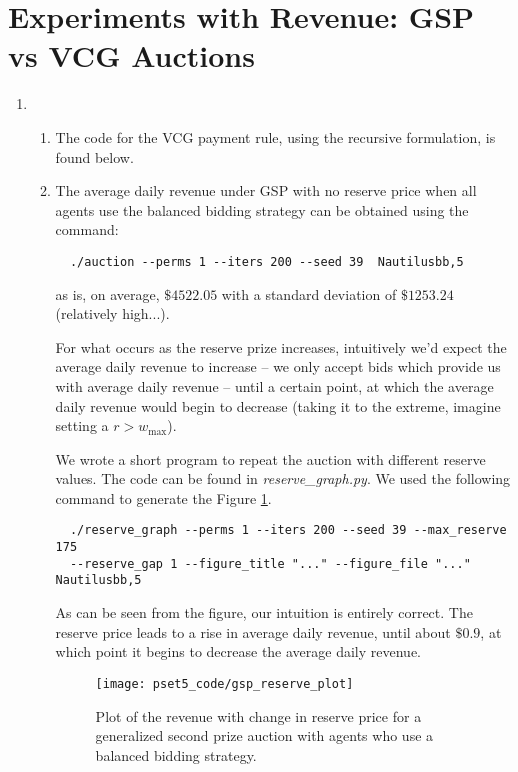 \documentclass[11pt]{article}
\begin{document}
\section*{Experiments with Revenue: GSP vs VCG Auctions}
\begin{enumerate}[resume]
\item 
  \begin{enumerate}
  \item The code for the VCG payment rule, using the recursive formulation, is found below. 
  
  
  \item 
  The average daily revenue under GSP with no reserve price when all agents use the balanced bidding strategy can be obtained using the command:
  \begin{lstlisting}
  ./auction --perms 1 --iters 200 --seed 39  Nautilusbb,5
  \end{lstlisting}
  as is, on average, $\$4522.05$ with a standard deviation of $\$1253.24$ (relatively high...).

  For what occurs as the reserve prize increases, intuitively we'd expect the average daily revenue to increase -- we only accept bids which provide us with average daily revenue -- until a certain point, at which the average daily revenue would begin to decrease (taking it to the extreme, imagine setting a $r > w_{\text{max}}$).

  We wrote a short program to repeat the auction with different reserve values. The code can be found in {\it reserve\_graph.py}. We used the following command to generate the Figure \ref{fig:gps_plot}.

  \begin{lstlisting}
  ./reserve_graph --perms 1 --iters 200 --seed 39 --max_reserve 175 
  --reserve_gap 1 --figure_title "..." --figure_file "..." Nautilusbb,5
  \end{lstlisting}
  As can be seen from the figure, our intuition is entirely correct. The reserve price leads to a rise in average daily revenue, until about $\$0.9$, at which point it begins to decrease the average daily revenue.

  \begin{figure}[!h]
  \centering
    \texttt{[image: pset5\_code/gsp\_reserve\_plot]}
    \caption{Plot of the revenue with change in reserve price for a generalized second prize auction with agents who use a balanced bidding strategy.}
    \label{fig:gps_plot}
  \end{figure}


\end{enumerate}
\end{enumerate}
\end{document}
